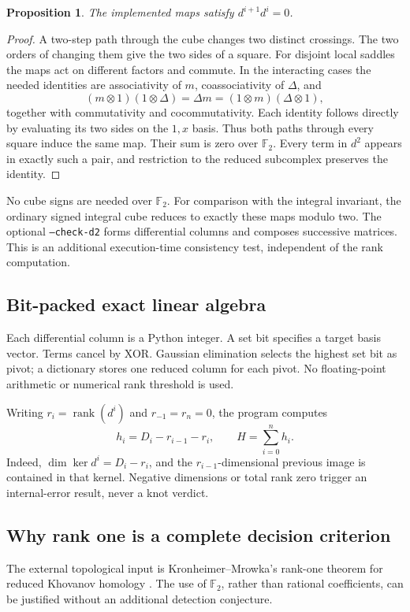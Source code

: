 \documentclass[11pt]{article}
\newtheorem{proposition}[theorem]{Proposition}
\theoremstyle{remark}\newtheorem{remark}[theorem]{Remark}
\newcommand{\F}{\mathbb F_2}
\newcommand{\code}[1]{\texttt{#1}}
\begin{document}
\begin{proposition}
The implemented maps satisfy $d^{i+1}d^i=0$.
\end{proposition}
\begin{proof}
A two-step path through the cube changes two distinct crossings. The two orders
of changing them give the two sides of a square. For disjoint local saddles the
maps act on different factors and commute. In the interacting cases the needed
identities are associativity of $m$, coassociativity of $\Delta$, and
\[
 (m\otimes1)(1\otimes\Delta)=\Delta m
 =(1\otimes m)(\Delta\otimes1),
\]
together with commutativity and cocommutativity. Each identity follows directly
by evaluating its two sides on the $1,x$ basis. Thus both paths through every
square induce the same map. Their sum is zero over $\F$. Every term in $d^2$
appears in exactly such a pair, and restriction to the reduced subcomplex
preserves the identity.
\end{proof}

No cube signs are needed over $\F$. For comparison with the integral invariant,
the ordinary signed integral cube reduces to exactly these maps modulo two.
The optional \code{--check-d2} forms differential columns and composes successive
matrices. This is an additional execution-time consistency test, independent
of the rank computation.

\subsection{Bit-packed exact linear algebra}
Each differential column is a Python integer. A set bit specifies a target
basis vector. Terms cancel by XOR. Gaussian elimination selects the highest
set bit as pivot; a dictionary stores one reduced column for each pivot.
No floating-point arithmetic or numerical rank threshold is used.

Writing $r_i=\operatorname{rank}(d^i)$ and $r_{-1}=r_n=0$, the program computes
\[
 h_i=D_i-r_{i-1}-r_i,\qquad H=\sum_{i=0}^{n}h_i.
\]
Indeed, $\dim\ker d^i=D_i-r_i$, and the $r_{i-1}$-dimensional previous image is
contained in that kernel. Negative dimensions or total rank zero trigger an
internal-error result, never a knot verdict.

\subsection{Why rank one is a complete decision criterion}
The external topological input is Kronheimer--Mrowka's rank-one theorem for
reduced Khovanov homology \cite{kronheimermrowka}. The use of $\F$, rather than
rational coefficients, can be justified without an additional detection
conjecture.
\end{document}
